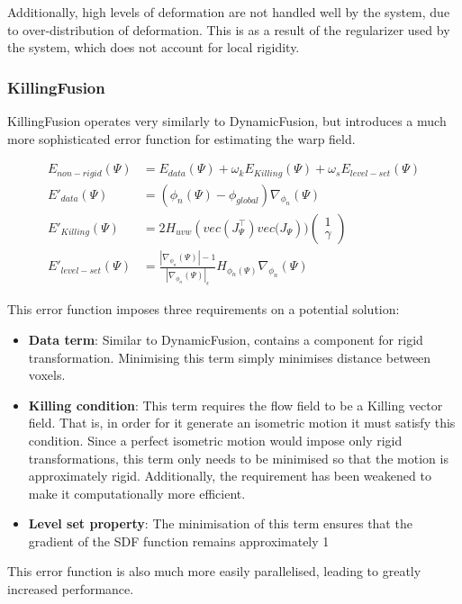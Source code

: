 \documentclass[a4paper]{article}
\begin{document}
Additionally, high levels of deformation are not handled well by the system, due to over-distribution of deformation. This is as a result of the regularizer used by the system, which does not account for local rigidity.


\subsubsection{KillingFusion}

KillingFusion operates very similarly to DynamicFusion, but introduces a much more sophisticated error function for estimating the warp field.

\begin{align*}
E_{non-rigid}(\Psi) &= E_{data}(\Psi) + \omega_kE_{Killing}(\Psi) + \omega_sE_{level-set}(\Psi)\\
E'_{data}(\Psi) &= (\phi_n(\Psi) - \phi_{global}) \nabla_{\phi_n}(\Psi)\\
E'_{Killing}(\Psi) &= 2H_{uvw}(vec(J^{\top}_{\Psi}) vec\big(J_{\Psi})\big)\begin{pmatrix}1\\\gamma \end{pmatrix}\\
E'_{level-set}(\Psi) &= \frac{|\nabla_{\phi_n}(\Psi)| - 1}{|\nabla_{\phi_n}(\Psi)|_\epsilon}H_{\phi_n(\Psi)}\nabla_{\phi_n}(\Psi)
\end{align*}

This error function imposes three requirements on a potential solution:
\begin{itemize}
\item \textbf{Data term}: Similar to DynamicFusion, contains a component for rigid transformation. Minimising this term simply minimises distance between voxels.
\item \textbf{Killing condition}: This term requires the flow field to be a Killing vector field. That is, in order for it generate an isometric motion it must satisfy this condition. Since a perfect isometric motion would impose only rigid transformations, this term only needs to be minimised so that the motion is approximately rigid. Additionally, the requirement has been weakened to make it computationally more efficient.
\item \textbf{Level set property}: The minimisation of this term ensures that the gradient of the SDF function remains approximately 1
\end{itemize}

This error function is also much more easily parallelised, leading to greatly increased performance.\\
\end{document}
